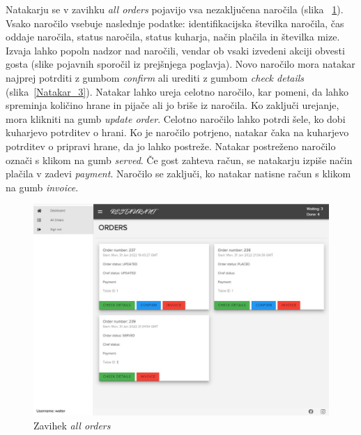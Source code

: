 \documentclass[a4paper, 12pt]{book}
\begin{document}
Natakarju se v zavihku \textit{all orders} pojavijo vsa nezaključena naročila (slika ~\ref{Natakar_2}). Vsako naročilo vsebuje naslednje podatke: identifikacijska številka naročila, čas oddaje naročila, status naročila, status kuharja, način plačila in številka mize. Izvaja lahko popoln nadzor nad naročili, vendar ob vsaki izvedeni akciji obvesti gosta (slike pojavnih sporočil iz prejšnjega poglavja). Novo naročilo mora natakar najprej potrditi z gumbom \textit{confirm} ali urediti z gumbom \textit{check details} (slika~\ref{Natakar_3}). Natakar lahko ureja celotno naročilo, kar pomeni, da lahko spreminja količino hrane in pijače ali jo briše iz naročila. Ko zaključi urejanje, mora klikniti na gumb \textit{update order}. Celotno naročilo lahko potrdi šele, ko dobi kuharjevo potrditev o hrani. Ko je naročilo potrjeno, natakar čaka na kuharjevo potrditev o pripravi hrane, da jo lahko postreže. Natakar postreženo naročilo označi s klikom na gumb \textit{served}. Če gost zahteva račun, se natakarju izpiše način plačila v zadevi \textit{payment}. Naročilo se zaključi, ko natakar natisne račun s klikom na gumb \textit{invoice}.

\begin{figure}[!htb]
\centering
\includegraphics[width=13.3cm]{waiter_1.jpg}
\caption{Zavihek \textit{all orders}}
\label{Natakar_2}
\end{figure}
\end{document}
